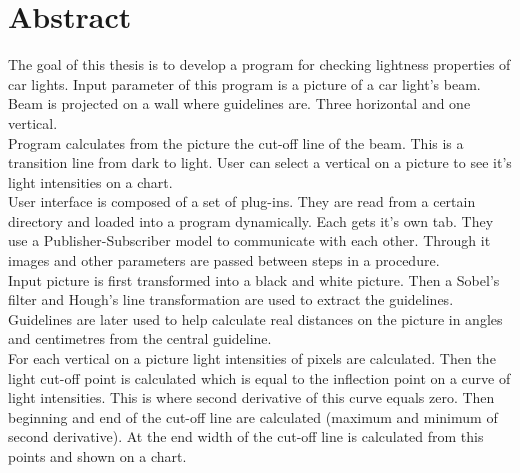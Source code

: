 \documentclass[oneside, a4paper, 12pt]{book}
\newcommand{\clearemptydoublepage}{\newpage{\pagestyle{empty}\cleardoublepage}}
\begin{document}
\chapter*{Abstract}

The goal of this thesis is to develop a program for checking lightness properties of car lights. Input parameter of this program is a picture of a car light's beam. Beam is projected on a wall where guidelines are. Three horizontal and one vertical. \\
Program calculates from the picture the cut-off line of the beam. This is a transition line from dark to light. User can select a vertical on a picture to see it's light intensities on a chart.\\
User interface is composed of a set of plug-ins. They are read from a certain directory and loaded into a program dynamically. Each gets it's own tab. They use a Publisher-Subscriber model to communicate with each other. Through it images and other parameters are passed between steps in a procedure.\\
Input picture is first transformed into a black and white picture. Then a Sobel's filter and Hough's line transformation are used to extract the guidelines. Guidelines are later used to help calculate real distances on the picture in angles and centimetres from the central guideline. \\
For each vertical on a picture light intensities of pixels are calculated. Then the light cut-off point is calculated which is equal to the inflection point on a curve of light intensities. This is where second derivative of this curve equals zero. Then beginning and end of the cut-off line are calculated (maximum and minimum of second derivative). At the end width of the cut-off line is calculated from this points and shown on a chart.


\clearemptydoublepage

\mainmatter
\setcounter{page}{1}
\pagestyle{fancy}
\end{document}
